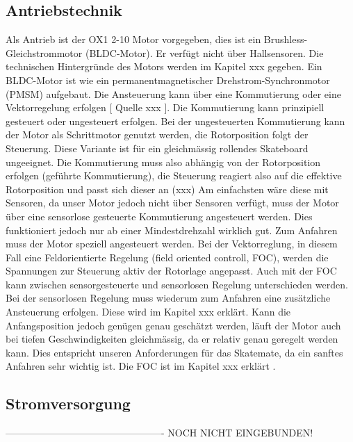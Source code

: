 \subsection*{Antriebstechnik}
Als Antrieb ist der OX1 2-10 Motor vorgegeben, dies ist ein Brushless-Gleichstrommotor (BLDC-Motor). Er verfügt nicht über Hallsensoren. Die technischen Hintergründe des Motors werden im Kapitel xxx gegeben. Ein BLDC-Motor ist wie ein permanentmagnetischer Drehstrom-Synchronmotor (PMSM) aufgebaut. 
Die Ansteuerung kann über eine Kommutierung oder eine Vektorregelung erfolgen\cite{BLDC} [ Quelle xxx ]. Die Kommutierung kann prinzipiell gesteuert oder ungesteuert erfolgen. Bei der ungesteuerten Kommutierung kann der Motor als Schrittmotor genutzt werden, die Rotorposition folgt der Steuerung. Diese Variante ist für ein gleichmässig rollendes Skateboard ungeeignet. Die Kommutierung muss also abhängig von der Rotorposition erfolgen (geführte Kommutierung), die Steuerung reagiert also auf die effektive Rotorposition und passt sich dieser an (xxx)  Am einfachsten wäre diese mit Sensoren, da unser Motor jedoch nicht über Sensoren verfügt, muss der Motor über eine sensorlose gesteuerte Kommutierung angesteuert werden. Dies funktioniert jedoch nur ab einer Mindestdrehzahl wirklich gut. Zum Anfahren muss der Motor speziell angesteuert werden. 
Bei der Vektorreglung, in diesem Fall eine Feldorientierte Regelung (field oriented controll, FOC), werden die Spannungen zur Steuerung aktiv der Rotorlage angepasst. Auch mit der FOC kann zwischen sensorgesteuerte und sensorlosen Regelung unterschieden werden. Bei der sensorlosen Regelung muss wiederum zum Anfahren eine zusätzliche Ansteuerung erfolgen. Diese wird im Kapitel xxx erklärt. Kann die Anfangsposition jedoch genügen genau geschätzt werden, läuft der Motor auch bei tiefen Geschwindigkeiten gleichmässig, da er relativ genau geregelt werden kann. Dies entspricht unseren Anforderungen für das Skatemate, da ein sanftes Anfahren sehr wichtig ist. Die FOC ist im Kapitel  xxx erklärt .

\subsection*{Stromversorgung}


-------------------------------------------------
NOCH NICHT EINGEBUNDEN! 

